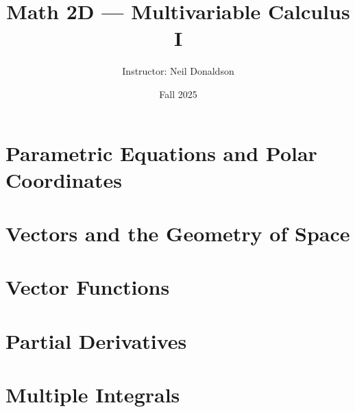 \documentclass[11pt]{article}
\title{Math 2D --- Multivariable Calculus I}
\author{Instructor: Neil Donaldson}
\date{Fall 2025}
\begin{document}
\maketitle
\tableofcontents
\newpage

\section{Parametric Equations and Polar Coordinates}


\section{Vectors and the Geometry of Space}


\section{Vector Functions}


\section{Partial Derivatives}


\section{Multiple Integrals}

\end{document}
